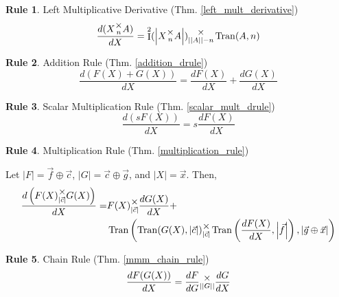 \documentclass[12pt]{book}
\theoremstyle{plain}
\theoremstyle{definition}
\newtheorem{drule}{Rule}
\theoremstyle{ppart}
\theoremstyle{case}
\theoremstyle{solution}
\DeclareMathOperator{\Ident}{I}
\DeclareMathOperator{\Tran}{Tran}
\newcommand{\mmult}[1]{\text{\raisebox{1ex}{$\underset{#1}{\times}$}}}
\newcommand{\shape}[1]{\left|#1\right|}
\begin{document}
\begin{appendices}
\begin{drule}
Left Multiplicative Derivative
(Thm. \ref{left_mult_derivative})
\[ \frac{d(X \mmult{n} A)}{dX} = \Ident^2(\shape{X \mmult{n} A}) \mmult{\shape{\shape{A}}-n} \Tran(A, n) \]
\end{drule}

\begin{drule}
Addition Rule
(Thm. \ref{addition_drule})
\[ \frac{d(F(X) + G(X))}{dX} = \frac{dF(X)}{dX} + \frac{dG(X)}{dX} \]
\end{drule}

\begin{drule}
Scalar Multiplication Rule
(Thm. \ref{scalar_mult_drule})
\[ \frac{d(sF(X))}{dX} = s\frac{dF(X)}{dX} \]
\end{drule}

\begin{drule}
Multiplication Rule
(Thm. \ref{multiplication_rule})

Let $\shape{F} = \vec{f} \oplus \vec{c}$, $\shape{G} = \vec{c} \oplus \vec{g}$,
and $\shape{X} = \vec{x}$. Then,
\begin{align*}
 \frac{d\left(F(X) \mmult{\shape{\vec{c}}} G(X)\right)}{dX} =&
 F(X) \mmult{\shape{\vec{c}}} \frac{dG(X)}{dX} + \\
 &\Tran\left(
   \Tran(G(X), \shape{\vec{c}})
     \mmult{\shape{\vec{c}}}
   \Tran\left(\frac{dF(X)}{dX}, \shape{\vec{f}}\right),
   \shape{\vec{g} \oplus \vec{x}}
 \right)
\end{align*}
\end{drule}

\begin{drule}
Chain Rule
(Thm. \ref{mmm_chain_rule})
\[ \frac{dF(G(X))}{dX} = \frac{dF}{dG} \mmult{\shape{\shape{G}}} \frac{dG}{dX} \]
\end{drule}

\end{appendices}



\end{document}
